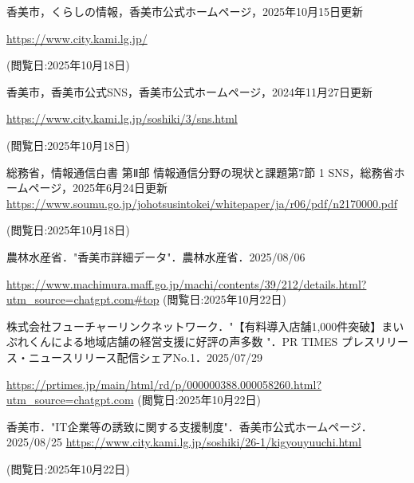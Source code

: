 \begin{thebibliography}{99}
     香美市，くらしの情報，香美市公式ホームページ，2025年10月15日更新 
    
    \url{https://www.city.kami.lg.jp/}

    (閲覧日:2025年10月18日)
    
     香美市，香美市公式SNS，香美市公式ホームページ，2024年11月27日更新 
    
    \url{https://www.city.kami.lg.jp/soshiki/3/sns.html}

    (閲覧日:2025年10月18日) 
    
     総務省，情報通信白書 第Ⅱ部 情報通信分野の現状と課題第7節 1 SNS，総務省ホームページ，2025年6月24日更新
    \url{https://www.soumu.go.jp/johotsusintokei/whitepaper/ja/r06/pdf/n2170000.pdf}

    (閲覧日:2025年10月18日) 

     農林水産省．"香美市詳細データ"．農林水産省．2025/08/06

    \url{https://www.machimura.maff.go.jp/machi/contents/39/212/details.html?utm_source=chatgpt.com#top}
    (閲覧日:2025年10月22日) 

     株式会社フューチャーリンクネットワーク．"【有料導入店舗1,000件突破】まいぷれくんによる地域店舗の経営支援に好評の声多数 "．PR TIMES プレスリリース・ニュースリリース配信シェアNo.1．2025/07/29
    
    \url{https://prtimes.jp/main/html/rd/p/000000388.000058260.html?utm_source=chatgpt.com}
    (閲覧日:2025年10月22日)

     香美市．"IT企業等の誘致に関する支援制度"．香美市公式ホームページ．2025/08/25
    \url{https://www.city.kami.lg.jp/soshiki/26-1/kigyouyuuchi.html}

    (閲覧日:2025年10月22日)


    




\end{thebibliography}